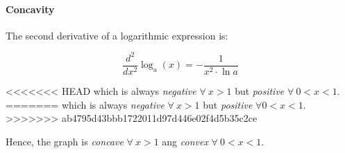 \paragraph{Concavity}
The second derivative of a logarithmic expression is:

$$\frac{d^2}{dx^2} \log_a (x) = -\frac{1}{x^2 \cdot \ln{a}}$$

<<<<<<< HEAD
which is always \emph{negative} $\forall\ x > 1$ but \emph{positive} $\forall\ 0 < x < 1$.
=======
which is always \emph{negative} $\forall\ x > 1$ but \emph{positive} $\forall 0 < x < 1$.
>>>>>>> ab4795d43bbb1722011d97d446e02f4d5b35c2ce

Hence, the graph is \emph{concave} $\forall\ x > 1$ ang \emph{convex} $\forall\ 0 < x < 1$.

